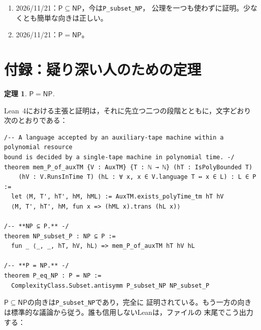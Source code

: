 \documentclass[11pt,a4paper]{amsart}
\newtheorem{teorema}{定理}
\theoremstyle{remark}
\begin{document}
\begin{enumerate}
{        1965年の定理は，2テープ機械は1テープ機械によって2乗の減速でシミュレートでき，
        両者は同じ言語を受理する，と述べる。我々の公理もまさにそう述べている。ただし，
        我々の2テープ機械は2本目のテープに証明書が最初から書かれていたのに対し，
        1テープ機械が受け取るのは~$x$~だけである。同じ言語を受理するには，証明書を
        自力で，多項式時間で見つけねばならない。急いで読めば古典であり，ゆっくり読めば
        $\mathsf{NP} \subseteq \mathsf{P}$と述べている。それは，シミュレーション時間に
        関する40ほどの本物の補題が並ぶファイルの真ん中，誰もゆっくり読まない場所に
        置かれている。ただしLeanは別で，ビルドのたびにその名を挙げる。}
  \item 2026/11/21：$\mathsf{P} \subseteq \mathsf{NP}$，今は\texttt{P\_subset\_NP}，
        公理を一つも使わずに証明。少なくとも簡単な向きは正しい。
  \item 2026/11/21：$\mathsf{P} = \mathsf{NP}$。
\end{enumerate}

\appendix
\section*{付録：疑り深い人のための定理}

\begin{teorema}\label{thm:main}
$\mathsf{P} = \mathsf{NP}$.
\end{teorema}

Lean~4における主張と証明は，それに先立つ二つの段階とともに，文字どおり次のとおりである：

\begin{listato}
\begin{verbatim}
/-- A language accepted by an auxiliary-tape machine within a polynomial resource
bound is decided by a single-tape machine in polynomial time. -/
theorem mem_P_of_auxTM {V : AuxTM} {T : ℕ → ℕ} (hT : IsPolyBounded T)
    (hV : V.RunsInTime T) (hL : ∀ x, x ∈ V.language T ↔ x ∈ L) : L ∈ P :=
  let ⟨M, T', hT', hM, hML⟩ := AuxTM.exists_polyTime_tm hT hV
  ⟨M, T', hT', hM, fun x => (hML x).trans (hL x)⟩

/-- **NP ⊆ P.** -/
theorem NP_subset_P : NP ⊆ P :=
  fun _ ⟨_, _, hT, hV, hL⟩ => mem_P_of_auxTM hT hV hL

/-- **P = NP.** -/
theorem P_eq_NP : P = NP :=
  ComplexityClass.Subset.antisymm P_subset_NP NP_subset_P
\end{verbatim}
\end{listato}

$\mathsf{P} \subseteq \mathsf{NP}$の向きは\texttt{P\_subset\_NP}であり，完全に
証明されている。もう一方の向きは標準的な議論から従う。誰も信用しないLeanは，ファイルの
末尾でこう出力する：
\end{document}
